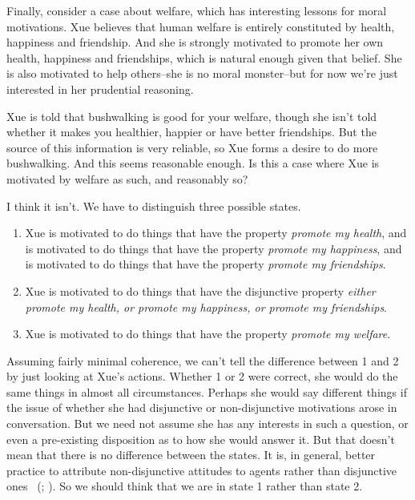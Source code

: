 \documentclass[
  10pt,
  letterpaper,
  twoside]{scrbook}
\providecommand{\tightlist}{%
  \setlength{\itemsep}{0pt}\setlength{\parskip}{0pt}}\usepackage{longtable,booktabs,array}
\begin{document}
Finally, consider a case about welfare, which has interesting lessons
for moral motivations. {Xue} believes that human welfare is entirely
constituted by health, happiness and friendship. And she is strongly
motivated to promote her own health, happiness and friendships, which is
natural enough given that belief. She is also motivated to help
others--she is no moral monster--but for now we're just interested in
her prudential reasoning.

{Xue} is told that bushwalking is good for your welfare, though she
isn't told whether it makes you healthier, happier or have better
friendships. But the source of this information is very reliable, so
{Xue} forms a desire to do more bushwalking. And this seems reasonable
enough. Is this a case where {Xue} is motivated by welfare as such, and
reasonably so?

I think it isn't. We have to distinguish three possible states.

\begin{enumerate}
\def\labelenumi{\arabic{enumi}.}
\tightlist
\item
  {Xue} is motivated to do things that have the property \emph{promote
  my health}, and is motivated to do things that have the property
  \emph{promote my happiness}, and is motivated to do things that have
  the property \emph{promote my friendships}.
\item
  {Xue} is motivated to do things that have the disjunctive property
  \emph{either promote my health, or promote my happiness, or promote my
  friendships}.
\item
  {Xue} is motivated to do things that have the property \emph{promote
  my welfare}.
\end{enumerate}

Assuming fairly minimal coherence, we can't tell the difference between
1 and 2 by just looking at {Xue}'s actions. Whether 1 or 2 were correct,
she would do the same things in almost all circumstances. Perhaps she
would say different things if the issue of whether she had disjunctive
or non-disjunctive motivations arose in conversation. But we need not
assume she has any interests in such a question, or even a pre-existing
disposition as to how she would answer it. But that doesn't mean that
there is no difference between the states. It is, in general, better
practice to attribute non-disjunctive attitudes to agents rather than
disjunctive ones ~(;
). So we should think
that we are in state 1 rather than state 2.
\end{document}
